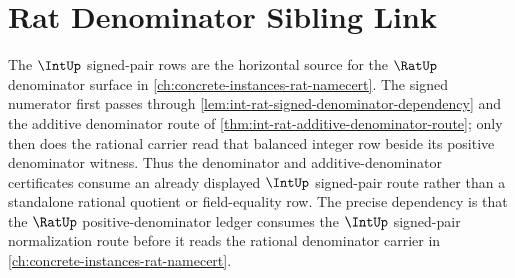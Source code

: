 \section{Rat Denominator Sibling Link}
\label{sec:int-rat-denominator-sibling-link}

The $\IntUp$ signed-pair rows are the horizontal source for the $\RatUp$ denominator surface in \autoref{ch:concrete-instances-rat-namecert}. The signed numerator first passes through \autoref{lem:int-rat-signed-denominator-dependency} and the additive denominator route of \autoref{thm:int-rat-additive-denominator-route}; only then does the rational carrier read that balanced integer row beside its positive denominator witness. Thus the denominator and additive-denominator certificates consume an already displayed $\IntUp$ signed-pair route rather than a standalone rational quotient or field-equality row. The precise dependency is that the $\RatUp$ positive-denominator ledger consumes the $\IntUp$ signed-pair normalization route before it reads the rational denominator carrier in \autoref{ch:concrete-instances-rat-namecert}.
